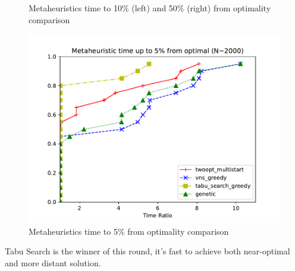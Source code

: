 \begin{figure}[h]
\begin{minipage}{.50\textwidth}
    \end{minipage}
    \caption[Metaheuristics time to 10\% and 50\% from optimality
    comparison]{\centering Metaheuristics time to 10\% (left) and 50\% (right) from optimality
    comparison}
\end{figure}


\begin{figure}[h]
    \centering
        \includegraphics[width=0.75\linewidth]{figures/meta_5.pdf}
    \caption{\centering Metaheuristics time to 5\% from optimality
    comparison}
\end{figure}

Tabu Search is the winner of this round, it's fast to achieve both near-optimal
and more distant solution.\\

